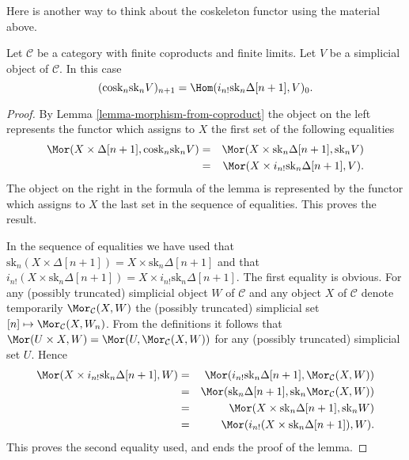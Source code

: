 \noindent
Here is another way to think about the coskeleton functor
using the material above.

\begin{lemma}
\label{lemma-cosk-shriek}
Let $\mathcal{C}$ be a category with finite coproducts
and finite limits. Let $V$ be a simplicial object of $\mathcal{C}$.
In this case
$$
(\text{cosk}_n \text{sk}_n V)_{n + 1}
=
\Hom(i_{n !}\text{sk}_n \Delta[n + 1], V)_0.
$$
\end{lemma}

\begin{proof}
By Lemma \ref{lemma-morphism-from-coproduct}
the object on the left represents the functor
which assigns to $X$ the first set of the following
equalities
\begin{eqnarray*}
\Mor(X \times \Delta[n + 1], \text{cosk}_n \text{sk}_n V)
& = &
\Mor(X \times \text{sk}_n \Delta[n + 1], \text{sk}_n V) \\
& = &
\Mor(X \times i_{n !} \text{sk}_n \Delta[n + 1], V).
\end{eqnarray*}
The object on the right in the formula of the lemma
is represented by the functor which assigns to $X$
the last set in the sequence of equalities.
This proves the result.

\medskip\noindent
In the sequence of equalities we have used that
$\text{sk}_n (X \times \Delta[n + 1]) = X \times \text{sk}_n \Delta[n + 1]$
and that
$i_{n!}(X \times \text{sk}_n \Delta[n + 1]) =
X \times i_{n !} \text{sk}_n \Delta[n + 1]$.
The first equality is obvious. For any (possibly truncated)
simplicial object $W$
of $\mathcal{C}$ and any object $X$ of $\mathcal{C}$
denote temporarily $\Mor_\mathcal{C}(X, W)$ the
(possibly truncated) simplicial set
$[n] \mapsto \Mor_\mathcal{C}(X, W_n)$. From the definitions
it follows that $\Mor(U \times X, W) =
\Mor(U, \Mor_\mathcal{C}(X, W))$ for any
(possibly truncated) simplicial set $U$. Hence
\begin{eqnarray*}
\Mor(X \times i_{n !} \text{sk}_n \Delta[n + 1], W)
& = &
\Mor(i_{n !} \text{sk}_n \Delta[n + 1], \Mor_\mathcal{C}(X, W)) \\
& = &
\Mor(\text{sk}_n \Delta[n + 1],
\text{sk}_n\Mor_\mathcal{C}(X, W)) \\
& = &
\Mor(X \times \text{sk}_n \Delta[n + 1], \text{sk}_nW) \\
& = &
\Mor(i_{n!}(X \times \text{sk}_n \Delta[n + 1]), W).
\end{eqnarray*}
This proves the second equality used, and ends the proof of the lemma.
\end{proof}




